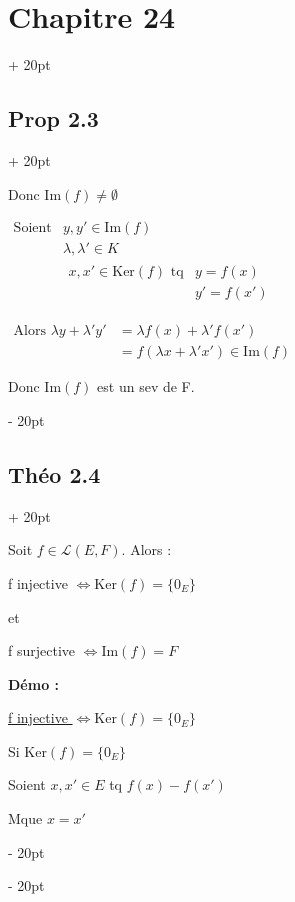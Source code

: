 \documentclass[12pt]{article}
\newcommand{\ind}[1][20pt]{\advance\leftskip + #1}
\newcommand{\deind}[1][20pt]{\advance\leftskip - #1}
\newenvironment{indt}[2][20pt]{#2 \par \ind[#1]}{\par \deind}
\begin{document}
\begin{indt}{\section*{Chapitre 24}}
\begin{indt}{\subsection*{Prop 2.3}}
\begin{enumerate}[leftmargin=2cm,rightmargin=2cm]
      Donc $\mathrm{Im}(f)\not =\emptyset$
      
      $\begin{array}{lll}
        \text{Soient} & y,y'\in\mathrm{Im}(f)
        \\
        & \lambda, \lambda'\in K
        \\
        & \begin{array}{ll}
          x,x'\in\mathrm{Ker}(f) \text{ tq} & y=f(x)
          \\
          & y'=f(x')
        \end{array}

      \end{array}$
      
      $\begin{array}{lll}
        \text{Alors }\lambda y+\lambda' y' & =\lambda f(x)+\lambda' f(x')
        \\
        & =f(\lambda x+\lambda' x')\in \mathrm{Im}(f)
      \end{array}$
      
      Donc $\mathrm{Im}(f)$ est un sev de F.
      \end{enumerate}
 
    \end{indt}

    \newpage
 
    \begin{indt}{\subsection*{Théo 2.4}}

      Soit $f\in\mathcal{L}(E,F)$. Alors :
      
      f injective $\Longleftrightarrow\mathrm{Ker}(f)=\{0_E\}$

      et

      f surjective $\Longleftrightarrow\mathrm{Im}(f)=F$

      \vspace{10pt}
      
      \textbf{Démo :}

      \vspace{10pt}

      \underline{f injective $\Longleftrightarrow\mathrm{Ker}(f)=\{0_E\}$}

      Si $\mathrm{Ker}(f)=\{0_E\}$

      Soient $x,x'\in E$ tq $f(x)-f(x')$

      Mque $x=x'$


\end{indt}
\end{indt}
\end{document}
